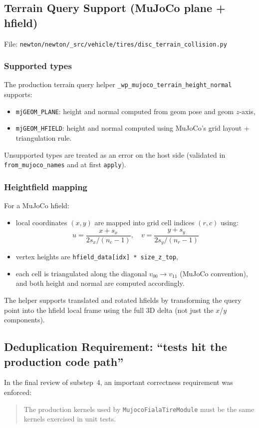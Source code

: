 \subsection{Terrain Query Support (MuJoCo plane + hfield)}
\label{sec:substep4-terrain-query}
File: \texttt{newton/newton/\_src/vehicle/tires/disc\_terrain\_collision.py}

\subsubsection{Supported types}
The production terrain query helper \texttt{\_wp\_mujoco\_terrain\_height\_normal} supports:
\begin{itemize}
  \item \texttt{mjGEOM\_PLANE}: height and normal computed from geom pose and geom $z$-axis,
  \item \texttt{mjGEOM\_HFIELD}: height and normal computed using MuJoCo's grid layout + triangulation rule.
\end{itemize}
Unsupported types are treated as an error on the host side (validated in \texttt{from\_mujoco\_names} and at first \texttt{apply}).

\subsubsection{Heightfield mapping}
For a MuJoCo hfield:
\begin{itemize}
  \item local coordinates $(x,y)$ are mapped into grid cell indices $(r,c)$ using:
    \[
      u = \frac{x + s_x}{2s_x/(n_c-1)},\quad v = \frac{y + s_y}{2s_y/(n_r-1)}
    \]
  \item vertex heights are \texttt{hfield\_data[idx] * size\_z\_top},
  \item each cell is triangulated along the diagonal $v_{00}\rightarrow v_{11}$ (MuJoCo convention),
        and both height and normal are computed accordingly.
\end{itemize}
The helper supports translated and rotated hfields by transforming the query point into the hfield local frame
using the full 3D delta (not just the $x$/$y$ components).

\subsection{Deduplication Requirement: ``tests hit the production code path''}
\label{sec:substep4-dedup}
In the final review of substep~4, an important correctness requirement was enforced:
\begin{quote}
  The production kernels used by \texttt{MujocoFialaTireModule} must be the same kernels exercised in unit tests.
\end{quote}

